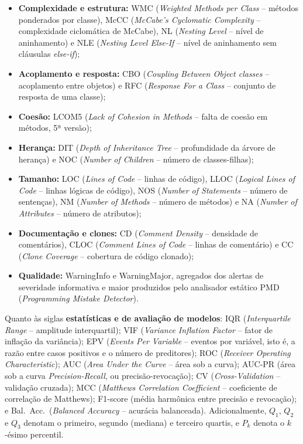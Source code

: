 \documentclass[conference]{IEEEtran}
\begin{document}
\begin{itemize}
    \item \textbf{Complexidade e estrutura:} WMC (\textit{Weighted Methods per Class} -- métodos ponderados por classe), McCC (\textit{McCabe's Cyclomatic Complexity} -- complexidade ciclomática de McCabe), NL (\textit{Nesting Level} -- nível de aninhamento) e NLE (\textit{Nesting Level Else-If} -- nível de aninhamento sem cláusulas \textit{else-if});
    \item \textbf{Acoplamento e resposta:} CBO (\textit{Coupling Between Object classes} -- acoplamento entre objetos) e RFC (\textit{Response For a Class} -- conjunto de resposta de uma classe);
    \item \textbf{Coesão:} LCOM5 (\textit{Lack of Cohesion in Methods} -- falta de coesão em métodos, 5ª versão);
    \item \textbf{Herança:} DIT (\textit{Depth of Inheritance Tree} -- profundidade da árvore de herança) e NOC (\textit{Number of Children} -- número de classes-filhas);
    \item \textbf{Tamanho:} LOC (\textit{Lines of Code} -- linhas de código), LLOC (\textit{Logical Lines of Code} -- linhas lógicas de código), NOS (\textit{Number of Statements} -- número de sentenças), NM (\textit{Number of Methods} -- número de métodos) e NA (\textit{Number of Attributes} -- número de atributos);
    \item \textbf{Documentação e clones:} CD (\textit{Comment Density} -- densidade de comentários), CLOC (\textit{Comment Lines of Code} -- linhas de comentário) e CC (\textit{Clone Coverage} -- cobertura de código clonado);
    \item \textbf{Qualidade:} WarningInfo e WarningMajor, agregados dos alertas de severidade informativa e maior produzidos pelo analisador estático PMD (\textit{Programming Mistake Detector}).
\end{itemize}

Quanto às siglas \textbf{estatísticas e de avaliação de modelos}: IQR (\textit{Interquartile Range} -- amplitude interquartil); VIF (\textit{Variance Inflation Factor} -- fator de inflação da variância); EPV (\textit{Events Per Variable} -- eventos por variável, isto é, a razão entre casos positivos e o número de preditores); ROC (\textit{Receiver Operating Characteristic}); AUC (\textit{Area Under the Curve} -- área sob a curva); AUC-PR (área sob a curva \textit{Precision-Recall}, ou precisão-revocação); CV (\textit{Cross-Validation} -- validação cruzada); MCC (\textit{Matthews Correlation Coefficient} -- coeficiente de correlação de Matthews); F1-score (média harmônica entre precisão e revocação); e Bal.\ Acc.\ (\textit{Balanced Accuracy} -- acurácia balanceada). Adicionalmente, $Q_1$, $Q_2$ e $Q_3$ denotam o primeiro, segundo (mediana) e terceiro quartis, e $P_k$ denota o $k$-ésimo percentil.
\end{document}
